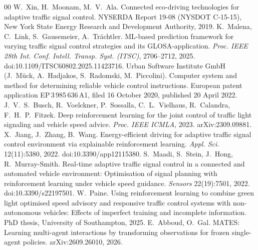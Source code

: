 \begin{thebibliography}{00}
 W.~Xin, H.~Moonam, M.~V.~Ala. Connected eco-driving technologies for adaptive traffic signal control. NYSERDA Report 19-08 (NYSDOT C-15-15), New York State Energy Research and Development Authority, 2019.
 K.~Malena, C.~Link, S.~Gausemeier, A.~Tr\"achtler. ML-based prediction framework for varying traffic signal control strategies and its GLOSA-application. \emph{Proc. IEEE 28th Int. Conf. Intell. Transp. Syst. (ITSC)}, 2706--2712, 2025. doi:10.1109/ITSC60802.2025.11423716.
 Urban Software Institute GmbH (J.~M\"uck, A.~Hadjakos, S.~Radomski, M.~Piccolini). Computer system and method for determining reliable vehicle control instructions. European patent application EP\,3\,985\,636\,A1, filed 16 October 2020, published 20 April 2022.
 J.~V.~S.~Busch, R.~Voelckner, P.~Sossalla, C.~L.~Vielhaus, R.~Calandra, F.~H.~P.~Fitzek. Deep reinforcement learning for the joint control of traffic light signaling and vehicle speed advice. \emph{Proc. IEEE ICMLA}, 2023. arXiv:2309.09881.
 X.~Jiang, J.~Zhang, B.~Wang. Energy-efficient driving for adaptive traffic signal control environment via explainable reinforcement learning. \emph{Appl. Sci.} 12(11):5380, 2022. doi:10.3390/app12115380.
 S.~Maadi, S.~Stein, J.~Hong, R.~Murray-Smith. Real-time adaptive traffic signal control in a connected and automated vehicle environment: Optimisation of signal planning with reinforcement learning under vehicle speed guidance. \emph{Sensors} 22(19):7501, 2022. doi:10.3390/s22197501.
 W.~Paine. Using reinforcement learning to combine green light optimised speed advisory and responsive traffic control systems with non-autonomous vehicles: Effects of imperfect training and incomplete information. PhD thesis, University of Southampton, 2025.
 E.~Abboud, O.~Gal. MATES: Learning multi-agent interactions by transforming observations for frozen single-agent policies. arXiv:2609.26010, 2026.
\end{thebibliography}

\appendices
